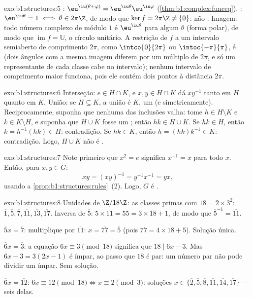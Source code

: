 \begin{solution}{exo:b1:structures:5}
: $\eu^{\iu(\theta + \varphi)} =
\eu^{\iu\theta}\eu^{\iu\varphi}$ (\cref{thm:b1:complex:funceq}).
: $\eu^{\iu\theta} = 1 \iff \theta \in 2\pi\Z$, de modo que $\ker f =
2\pi\Z \neq \{0\}$: não . Imagem: todo número complexo de módulo $1$ é
$\eu^{\iu\theta}$ para algum $\theta$ (forma polar), de modo que
$\operatorname{im} f = \mathbb{U}$, o círculo unitário. A restrição
de $f$ a um intervalo semiaberto de comprimento $2\pi$, como
$\intco{0}{2\pi}$ ou $\intoc{-\pi}{\pi}$, é  (dois ângulos
com a mesma imagem diferem por um múltiplo de $2\pi$, e só um
representante de cada classe cabe no intervalo); nenhum intervalo de
comprimento maior funciona, pois ele contém dois pontos à distância
$2\pi$.
\end{solution}

\begin{solution}{exo:b1:structures:6}
Interseção: $e \in H \cap K$, e $x, y \in H \cap K$ dá
$xy^{-1}$ tanto em $H$ quanto em $K$. União: se $H \subseteq K$, a união é
$K$, um  (e simetricamente). Reciprocamente, suponha que nenhuma
das inclusões valha: tome $h \in H \setminus K$ e $k \in K \setminus
H$, e suponha que $H \cup K$ fosse um ; então $hk \in H \cup K$.
Se $hk \in H$, então $k = h^{-1}(hk) \in H$: contradição. Se $hk \in
K$, então $h = (hk)k^{-1} \in K$: contradição. Logo, $H \cup K$ não é
.
\end{solution}

\begin{solution}{exo:b1:structures:7}
Note primeiro que $x^2 = e$ significa $x^{-1} = x$ para todo $x$. Então, para
$x, y \in G$:
\[
xy = (xy)^{-1} = y^{-1} x^{-1} = yx ,
\]
usando a \cref{prop:b1:structures:rules}~(2). Logo, $G$ é .
\end{solution}

\begin{solution}{exo:b1:structures:8}
Unidades de $\Z/18\Z$: as classes primas com $18 = 2 \times 3^2$:
$\overline 1, \overline 5, \overline 7, \overline{11}, \overline{13},
\overline{17}$. Inversa de $\overline 5$: $5 \times 11 = 55 = 3\times
18 + 1$, de modo que $\overline 5^{-1} = \overline{11}$.

$\overline 5 x = \overline 7$: multiplique por $\overline{11}$: $x =
\overline{77} = \overline 5$ (pois $77 = 4\times 18 + 5$). Solução
única.

$\overline 6 x = \overline 3$: a equação $6x \equiv 3 \pmod{18}$
significa que $18 \mid 6x - 3$. Mas $6x - 3 = 3(2x - 1)$ é ímpar, ao passo que $18$
é par: um número par não pode dividir um ímpar. Sem solução.

$\overline 6 x = \overline{12}$: $6x \equiv 12 \pmod{18} \iff x
\equiv 2 \pmod 3$: soluções $x \in \{\overline 2, \overline 5,
\overline 8, \overline{11}, \overline{14}, \overline{17}\}$ --- seis
delas.
\end{solution}


